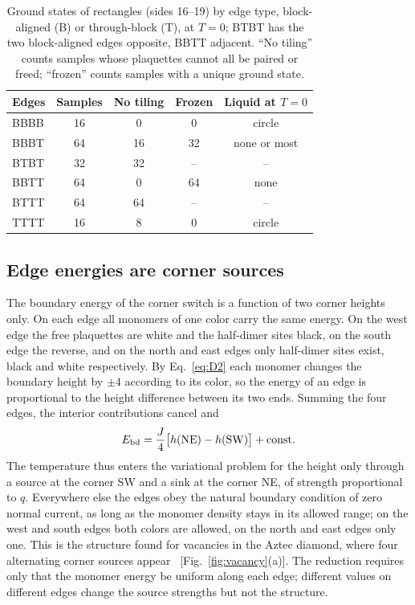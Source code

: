 \documentclass[reprint,aps,prb,floatfix,longbibliography,amsmath,amssymb]{revtex4-2}
\begin{document}
\begin{table}[t]
\caption{\label{tab:rect}Ground states of rectangles (sides 16--19) by edge type, block-aligned (B) or through-block (T), at $T=0$; BTBT has the two block-aligned edges opposite, BBTT adjacent. ``No tiling'' counts samples whose plaquettes cannot all be paired or freed; ``frozen'' counts samples with a unique ground state.}
\begin{ruledtabular}
\begin{tabular}{lcccc}
Edges & Samples & No tiling & Frozen & Liquid at $T=0$ \\
\hline
BBBB & 16 & 0 & 0 & circle \\
BBBT & 64 & 16 & 32 & none or most \\
BTBT & 32 & 32 & -- & -- \\
BBTT & 64 & 0 & 64 & none \\
BTTT & 64 & 64 & -- & -- \\
TTTT & 16 & 8 & 0 & circle \\
\end{tabular}
\end{ruledtabular}
\end{table}

\subsection{Edge energies are corner sources}\label{sec:corner}

The boundary energy of the corner switch is a function of two corner heights only. On each edge all monomers of one color carry the same energy. On the west edge the free plaquettes are white and the half-dimer sites black, on the south edge the reverse, and on the north and east edges only half-dimer sites exist, black and white respectively. By Eq.~\eqref{eq:D2} each monomer changes the boundary height by $\pm4$ according to its color, so the energy of an edge is proportional to the height difference between its two ends. Summing the four edges, the interior contributions cancel and
\begin{equation}\label{eq:Ebd}
  E_{\rm bd}=\frac J4\bigl[h({\rm NE})-h({\rm SW})\bigr]+\text{const}.
\end{equation}
The temperature thus enters the variational problem for the height only through a source at the corner SW and a sink at the corner NE, of strength proportional to $q$. Everywhere else the edges obey the natural boundary condition of zero normal current, as long as the monomer density stays in its allowed range; on the west and south edges both colors are allowed, on the north and east edges only one. This is the structure found for vacancies in the Aztec diamond, where four alternating corner sources appear~\cite{WonVacancies} [Fig.~\ref{fig:vacancy}(a)]. The reduction requires only that the monomer energy be uniform along each edge; different values on different edges change the source strengths but not the structure.
\end{document}
